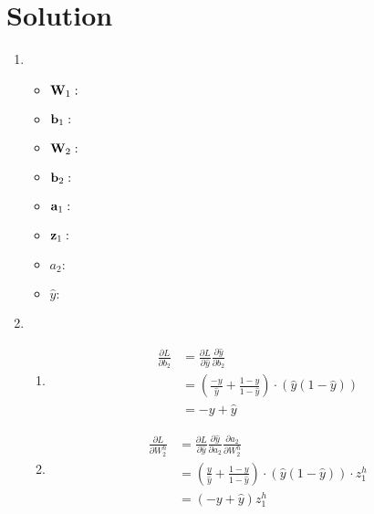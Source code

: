 \documentclass[submit]{harvardml}
\newenvironment{answer}
  {\section*{Solution}}
{}
\begin{document}
\begin{answer}
  \begin{enumerate}
    \item \begin{itemize}
            \item $\bold{W}_1 : $
            \item $\bold{b}_1 : $
            \item $\bold{W}_2 : $
            \item $\bold{b}_2 : $
            \item $\bold{a}_1 : $
            \item $\bold{z}_1 : $
            \item $a_2 : $
            \item $\hat{y} : $
          \end{itemize}

    \item \begin{enumerate}
            \item
                  \begin{align*}
                    \frac {\partial L}{\partial b_2} & = \frac{\partial L}{\partial \hat{y}} \frac{\partial \hat{y}}{\partial b_2} \\
                    & = (\frac{-y}{\hat{y}}+\frac{1-y}{1-\hat{y}})\cdot (\hat{y}(1-\hat{y})) \\
                    & = -y + \hat{y}
                  \end{align*}

            \item
                  \begin{align*}
                    \frac {\partial L}{\partial W_2^h} & = \frac{\partial L}{\partial \hat{y}} \frac{\partial \hat{y}}{\partial a_2}\frac{\partial a_2}{\partial W_2^h} \\
                    & = (\frac{y}{\hat{y}} + \frac{1-y}{1-\hat{y}}) \cdot (\hat{y}(1-\hat{y})) \cdot z_1^h \\
                    & = (-y + \hat{y}) z_1^h
                  \end{align*}


\end{enumerate}
\end{enumerate}
\end{answer}
\end{document}
